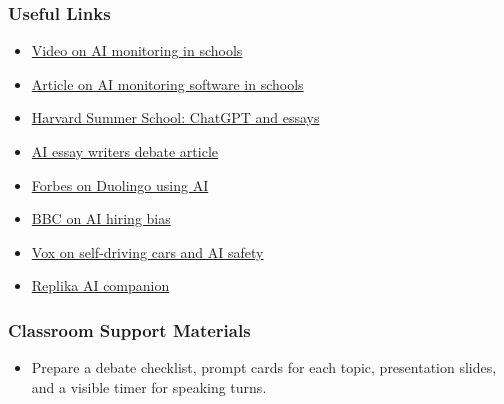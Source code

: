 \documentclass[11pt, a4paper]{article}
\begin{document}
\subsubsection*{Useful Links}
\begin{itemize}
    \item \href{https://www.youtube.com/watch?v=JMLsHI8aV0g&t=187s}{Video on AI monitoring in schools}
    \item \href{https://abc3340.com/news/nation-world/schools-turn-to-ai-powered-monitoring-software-to-catch-students-at-risk-of-self-harm-youth-mental-health-data-privacy-equity-concerns-school-issued-devices-rand-corp-artificial-intelligence-suicide-prevention}{Article on AI monitoring software in schools}
    \item \href{https://summer.harvard.edu/blog/should-i-use-chatgpt-to-write-my-essays/}{Harvard Summer School: ChatGPT and essays}
    \item \href{https://www.yomu.ai/resources/should-ai-essay-writers-be-banned-in-schools-a-heated-academic-debate}{AI essay writers debate article}
    \item \href{https://www.forbes.com/sites/bernardmarr/2023/04/28/the-amazing-ways-duolingo-is-using-ai-and-gpt-4/}{Forbes on Duolingo using AI}
    \item \href{https://www.bbc.com/worklife/article/20240214-ai-recruiting-hiring-software-bias-discrimination}{BBC on AI hiring bias}
    \item \href{https://www.vox.com/future-perfect/411522/self-driving-car-artificial-intelligence-autonomous-vehicle-safety-waymo-google}{Vox on self-driving cars and AI safety}
    \item \href{https://replika.ai/}{Replika AI companion}
\end{itemize}

\subsubsection*{Classroom Support Materials}
\begin{itemize}
    \item Prepare a debate checklist, prompt cards for each topic, presentation slides, and a visible timer for speaking turns.
\end{itemize}

\end{document}
